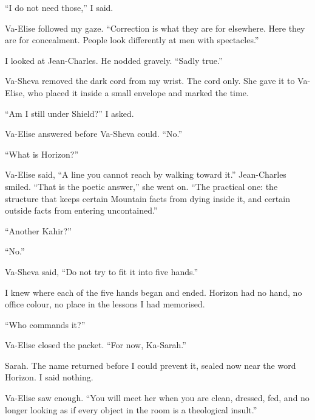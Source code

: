``I do not need those,'' I said.\par

Va-Elise followed my gaze. ``Correction is what they are for elsewhere. Here they are for concealment. People look differently at men with spectacles.''\par

I looked at Jean-Charles. He nodded gravely. ``Sadly true.''\par

Va-Sheva removed the dark cord from my wrist. The cord only. She gave it to Va-Elise, who placed it inside a small envelope and marked the time.\par

``Am I still under Shield?'' I asked.\par

Va-Elise answered before Va-Sheva could. ``No.''\par

``What is Horizon?''\par

Va-Elise said, ``A line you cannot reach by walking toward it.'' Jean-Charles smiled. ``That is the poetic answer,'' she went on. ``The practical one: the structure that keeps certain Mountain facts from dying inside it, and certain outside facts from entering uncontained.''\par

``Another Kahir?''\par

``No.''\par

Va-Sheva said, ``Do not try to fit it into five hands.''\par

I knew where each of the five hands began and ended. Horizon had no hand, no office colour, no place in the lessons I had memorised.\par

``Who commands it?''\par

Va-Elise closed the packet. ``For now, Ka-Sarah.''\par

Sarah. The name returned before I could prevent it, sealed now near the word Horizon. I said nothing.\par

Va-Elise saw enough. ``You will meet her when you are clean, dressed, fed, and no longer looking as if every object in the room is a theological insult.''\par

